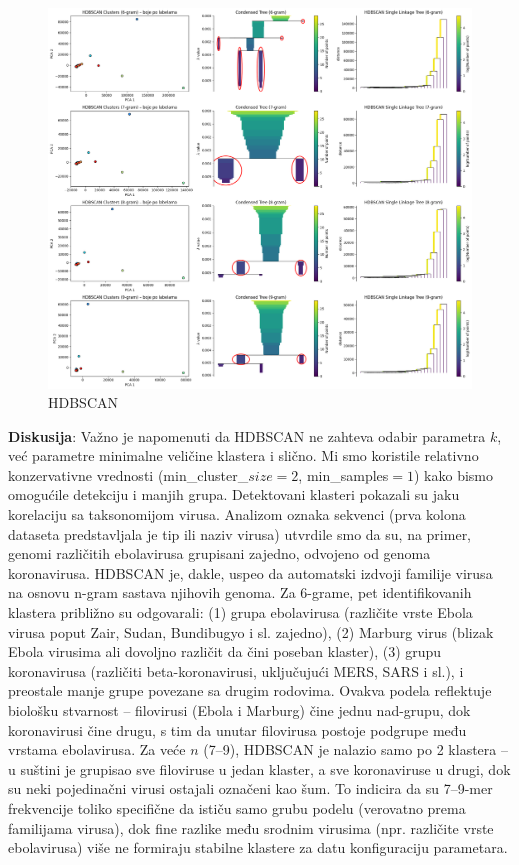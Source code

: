 \documentclass[a4paper,12pt]{article}
\begin{document}
\begin{figure}[H]
    \centering
    \includegraphics[width=1.2\textwidth]{images/hdbscan.png}
    \caption{HDBSCAN}
    \label{fig:3d}
\end{figure}

\noindent
\begin{minipage}{\textwidth}
\textbf{Diskusija}: Važno je napomenuti da HDBSCAN ne zahteva odabir parametra $k$, već parametre minimalne veličine klastera i slično. Mi smo koristile relativno konzervativne vrednosti (min\_cluster\_$size = 2$, min\_samples$ = 1$)
kako bismo omogućile detekciju i manjih grupa. Detektovani klasteri pokazali su jaku korelaciju sa
taksonomijom virusa. Analizom oznaka sekvenci (prva kolona dataseta predstavljala je tip ili naziv virusa)
utvrdile smo da su, na primer, genomi različitih ebolavirusa grupisani zajedno, odvojeno od genoma
koronavirusa. HDBSCAN je, dakle, uspeo da automatski izdvoji familije virusa na osnovu n-gram sastava
njihovih genoma. Za 6-grame, pet identifikovanih klastera približno su odgovarali: (1) grupa ebolavirusa
(različite vrste Ebola virusa poput Zair, Sudan, Bundibugyo i sl. zajedno), (2) Marburg virus (blizak Ebola
virusima ali dovoljno različit da čini poseban klaster), (3) grupu koronavirusa (različiti beta-koronavirusi,
uključujući MERS, SARS i sl.), i preostale manje grupe povezane sa drugim rodovima. Ovakva podela
reflektuje biološku stvarnost – filovirusi (Ebola i Marburg) čine jednu nad-grupu, dok koronavirusi čine
drugu, s tim da unutar filovirusa postoje podgrupe među vrstama ebolavirusa. Za veće $n$ (7–9), HDBSCAN
je nalazio samo po 2 klastera – u suštini je grupisao sve filoviruse u jedan klaster, a sve koronaviruse u drugi,
dok su neki pojedinačni virusi ostajali označeni kao šum. To indicira da su 7–9-mer frekvencije toliko
specifične da ističu samo grubu podelu (verovatno prema familijama virusa), dok fine razlike među srodnim
virusima (npr. različite vrste ebolavirusa) više ne formiraju stabilne klastere za datu konfiguraciju
parametara.
\end{minipage}
\vspace{1cm}
\end{document}

